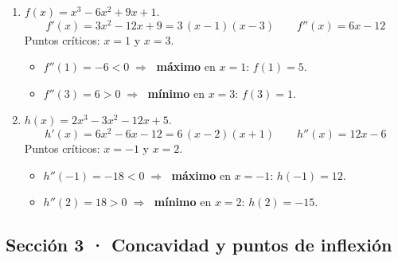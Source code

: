 \documentclass[12pt, letterpaper]{article}
\begin{document}
  \begin{enumerate}[leftmargin=*, label=\textbf{\arabic*.}]
    \item $f(x) = x^{3} - 6x^{2} + 9x + 1$.
    \[
      f'(x) = 3x^{2} - 12x + 9 = 3\,(x - 1)(x - 3)
      \qquad
      f''(x) = 6x - 12
    \]
    Puntos críticos: $x = 1$ y $x = 3$.
    \begin{itemize}
      \item $f''(1) = -6 < 0 \;\Rightarrow\;$ \textbf{máximo} en $x = 1$: $f(1) = 5$.
      \item $f''(3) = 6 > 0 \;\Rightarrow\;$ \textbf{mínimo} en $x = 3$: $f(3) = 1$.
    \end{itemize}

    \item $h(x) = 2x^{3} - 3x^{2} - 12x + 5$.
    \[
      h'(x) = 6x^{2} - 6x - 12 = 6\,(x - 2)(x + 1)
      \qquad
      h''(x) = 12x - 6
    \]
    Puntos críticos: $x = -1$ y $x = 2$.
    \begin{itemize}
      \item $h''(-1) = -18 < 0 \;\Rightarrow\;$ \textbf{máximo} en $x = -1$: $h(-1) = 12$.
      \item $h''(2) = 18 > 0 \;\Rightarrow\;$ \textbf{mínimo} en $x = 2$: $h(2) = -15$.
    \end{itemize}
  \end{enumerate}

  \subsection*{Sección 3 · Concavidad y puntos de inflexión}
\end{document}
